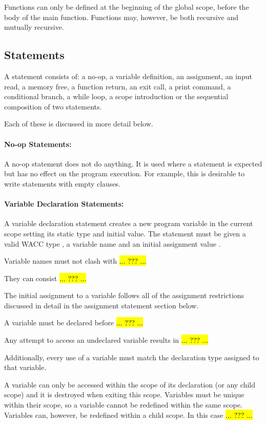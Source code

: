 \documentclass[a4paper]{article}
\theoremstyle{definition}
\begin{document}
Functions can only be defined at the beginning of the global scope, before the body of the main function.
Functions may, however, be both recursive and mutually recursive.

\subsection{Statements}
A statement  consists of:
a no-op,
a variable definition,
an assignment,
an input read,
a memory free,
a function return,
an exit call,
a print command,
a conditional branch,
a while loop,
a scope introduction
or the sequential composition of two statements.

Each of these is discussed in more detail below.

\paragraph{No-op Statements:}
A no-op statement  does not do anything.
It is used where a statement is expected but has no effect on the program execution.
For example, this is desirable to write  statements with empty  clauses.

\paragraph{Variable Declaration Statements:}
A variable declaration statement creates a new program variable in the current scope setting its static type and initial value.
The statement must be given a valid WACC type , a variable name  and an initial assignment value .

Variable names must not clash with \hl{... ??? ...}

They can consist \hl{... ??? ...}

The initial assignment to a variable follows all of the assignment restrictions discussed in detail in the assignment statement section below.

A variable must be declared before \hl{... ??? ...}

Any attempt to access an undeclared variable results in \hl{... ??? ...}

Additionally, every use of a variable must match the declaration type assigned to that variable.

A variable can only be accessed within the scope of its declaration (or any child scope) and it is destroyed when exiting this scope.
Variables must be unique within their scope, so a variable cannot be redefined within the same scope.
Variables can, however, be redefined within a child scope.
In this case \hl{... ??? ...}
\end{document}
